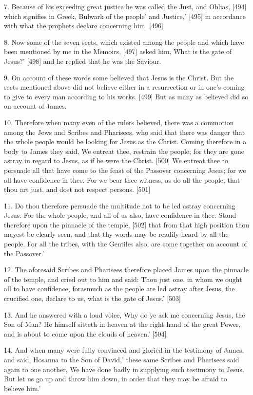 \documentclass[11pt]{article}
\begin{document}
\begin{thebibliography}{37}
7. Because of his exceeding great justice he was called the Just, and Oblias, [494] which signifies in Greek, Bulwark of the people' and Justice,' [495] in accordance with what the prophets declare concerning him. [496]


8. Now some of the seven sects, which existed among the people and which have been mentioned by me in the Memoirs, [497] asked him, What is the gate of Jesus?' [498] and he replied that he was the Saviour.

9. On account of these words some believed that Jesus is the Christ. But the sects mentioned above did not believe either in a resurrection or in one's coming to give to every man according to his works. [499] But as many as believed did so on account of James.

10. Therefore when many even of the rulers believed, there was a commotion among the Jews and Scribes and Pharisees, who said that there was danger that the whole people would be looking for Jesus as the Christ. Coming therefore in a body to James they said, We entreat thee, restrain the people; for they are gone astray in regard to Jesus, as if he were the Christ. [500] We entreat thee to persuade all that have come to the feast of the Passover concerning Jesus; for we all have confidence in thee. For we bear thee witness, as do all the people, that thou art just, and dost not respect persons. [501]

11. Do thou therefore persuade the multitude not to be led astray concerning Jesus. For the whole people, and all of us also, have confidence in thee. Stand therefore upon the pinnacle of the temple, [502] that from that high position thou mayest be clearly seen, and that thy words may be readily heard by all the people. For all the tribes, with the Gentiles also, are come together on account of the Passover.'

12. The aforesaid Scribes and Pharisees therefore placed James upon the pinnacle of the temple, and cried out to him and said: Thou just one, in whom we ought all to have confidence, forasmuch as the people are led astray after Jesus, the crucified one, declare to us, what is the gate of Jesus.' [503]

13. And he answered with a loud voice, Why do ye ask me concerning Jesus, the Son of Man? He himself sitteth in heaven at the right hand of the great Power, and is about to come upon the clouds of heaven.' [504]

14. And when many were fully convinced and gloried in the testimony of James, and said, Hosanna to the Son of David,' these same Scribes and Pharisees said again to one another, We have done badly in supplying such testimony to Jesus. But let us go up and throw him down, in order that they may be afraid to believe him.'


\end{thebibliography}
\end{document}
